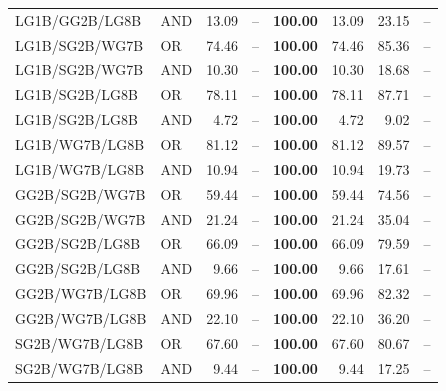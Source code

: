 \documentclass{article}
\begin{document}
{\begin{longtable}{llrrrrrr}
 LG1B/GG2B/LG8B           & AND     & 13.09            & --            & \textbf{100.00} & 13.09            & 23.15            & --    \\
 LG1B/SG2B/WG7B           & OR      & 74.46            & --            & \textbf{100.00} & 74.46            & 85.36            & --    \\
 LG1B/SG2B/WG7B           & AND     & 10.30            & --            & \textbf{100.00} & 10.30            & 18.68            & --    \\
 LG1B/SG2B/LG8B           & OR      & 78.11            & --            & \textbf{100.00} & 78.11            & 87.71            & --    \\
 LG1B/SG2B/LG8B           & AND     & 4.72             & --            & \textbf{100.00} & 4.72             & 9.02             & --    \\
 LG1B/WG7B/LG8B           & OR      & 81.12            & --            & \textbf{100.00} & 81.12            & 89.57            & --    \\
 LG1B/WG7B/LG8B           & AND     & 10.94            & --            & \textbf{100.00} & 10.94            & 19.73            & --    \\
 GG2B/SG2B/WG7B           & OR      & 59.44            & --            & \textbf{100.00} & 59.44            & 74.56            & --    \\
 GG2B/SG2B/WG7B           & AND     & 21.24            & --            & \textbf{100.00} & 21.24            & 35.04            & --    \\
 GG2B/SG2B/LG8B           & OR      & 66.09            & --            & \textbf{100.00} & 66.09            & 79.59            & --    \\
 GG2B/SG2B/LG8B           & AND     & 9.66             & --            & \textbf{100.00} & 9.66             & 17.61            & --    \\
 GG2B/WG7B/LG8B           & OR      & 69.96            & --            & \textbf{100.00} & 69.96            & 82.32            & --    \\
 GG2B/WG7B/LG8B           & AND     & 22.10            & --            & \textbf{100.00} & 22.10            & 36.20            & --    \\
 SG2B/WG7B/LG8B           & OR      & 67.60            & --            & \textbf{100.00} & 67.60            & 80.67            & --    \\
 SG2B/WG7B/LG8B           & AND     & 9.44             & --            & \textbf{100.00} & 9.44             & 17.25            & --    \\

\end{longtable}}
\end{document}
